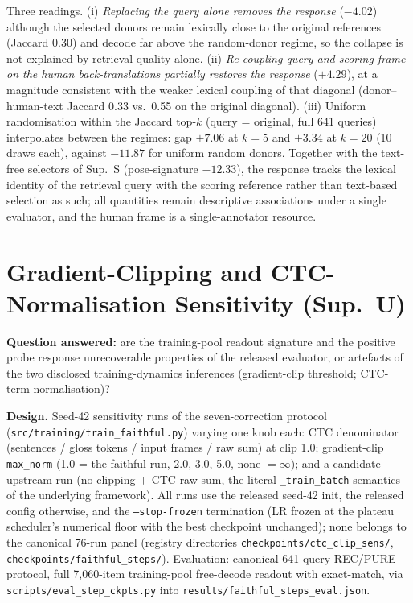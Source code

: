 \documentclass[pdflatex,sn-chicago]{sn-jnl}
\begin{document}
Three readings. (i) \emph{Replacing the query alone removes the response} ($-4.02$) although the selected donors remain lexically close to the original references (Jaccard 0.30) and decode far above the random-donor regime, so the collapse is not explained by retrieval quality alone. (ii) \emph{Re-coupling query and scoring frame on the human back-translations partially restores the response} ($+4.29$), at a magnitude consistent with the weaker lexical coupling of that diagonal (donor--human-text Jaccard 0.33 vs.\ 0.55 on the original diagonal). (iii) Uniform randomisation within the Jaccard top-$k$ (query = original, full 641 queries) interpolates between the regimes: gap $+7.06$ at $k{=}5$ and $+3.34$ at $k{=}20$ (10 draws each), against $-11.87$ for uniform random donors. Together with the text-free selectors of Sup.~S (pose-signature $-12.33$), the response tracks the lexical identity of the retrieval query with the scoring reference rather than text-based selection as such; all quantities remain descriptive associations under a single evaluator, and the human frame is a single-annotator resource.

\section{Gradient-Clipping and CTC-Normalisation Sensitivity (Sup.~U)}
\label{sec:appendix_clip_sensitivity}
\textbf{Question answered:} are the training-pool readout signature and the positive probe response unrecoverable properties of the released evaluator, or artefacts of the two disclosed training-dynamics inferences (gradient-clip threshold; CTC-term normalisation)?

\textbf{Design.} Seed-42 sensitivity runs of the seven-correction protocol (\texttt{src/training/train\_faithful.py}) varying one knob each: CTC denominator (sentences / gloss tokens / input frames / raw sum) at clip 1.0; gradient-clip \texttt{max\_norm} (1.0 = the faithful run, 2.0, 3.0, 5.0, none $=\infty$); and a candidate-upstream run (no clipping $+$ CTC raw sum, the literal \texttt{\_train\_batch} semantics of the underlying framework). All runs use the released seed-42 init, the released config otherwise, and the \texttt{--stop-frozen} termination (LR frozen at the plateau scheduler's numerical floor with the best checkpoint unchanged); none belongs to the canonical 76-run panel (registry directories \texttt{checkpoints/ctc\_clip\_sens/}, \texttt{checkpoints/faithful\_steps/}). Evaluation: canonical 641-query REC/PURE protocol, full 7{,}060-item training-pool free-decode readout with exact-match, via \texttt{scripts/eval\_step\_ckpts.py} into \texttt{results/faithful\_steps\_eval.json}.
\end{document}
